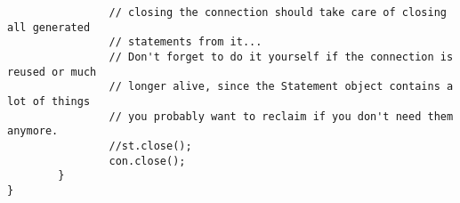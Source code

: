 \documentclass{article}
\begin{document}
\begin{verbatim}
                // closing the connection should take care of closing all generated
                // statements from it...
                // Don't forget to do it yourself if the connection is reused or much
                // longer alive, since the Statement object contains a lot of things
                // you probably want to reclaim if you don't need them anymore.
                //st.close();
                con.close();
        }
}
\end{verbatim}
\end{document}
